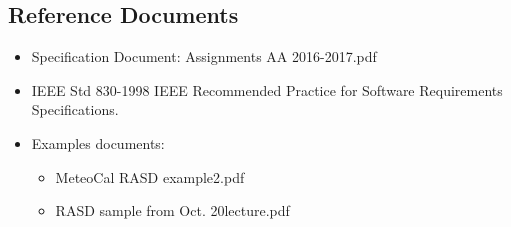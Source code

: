 \subsection{Reference Documents}
\begin{itemize}
\item Specification Document: Assignments AA 2016-2017.pdf
\item  IEEE Std 830-1998 IEEE Recommended Practice for Software Requirements
Specifications.
\item  Examples documents:  
\begin{itemize}
\item MeteoCal RASD example2.pdf
\item RASD sample from Oct. 20lecture.pdf 
\end {itemize}
\end {itemize}